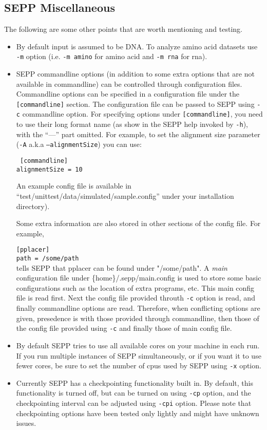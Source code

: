 \documentclass[11pt]{article} %
\newcommand{\sepp}{SEPP\xspace}
\newcommand{\ins}[1]{{\tt #1}}
\newcommand{\file}[1]{{\sf #1}}
\newcommand{\pplacer}{pplacer\xspace}
\begin{document}
\subsection{\sepp Miscellaneous }
The following are some other points that are worth mentioning and testing.
\begin{itemize}
\item By default input is assumed to be DNA. To analyze amino acid datasets use \ins{-m} option (i.e. \ins{-m amino} for amino acid and \ins{-m rna} for rna).
\item \sepp commandline options (in addition to some extra options that are not available in commandline) can be 
controlled through configuration files. 
Commandline options can be specified in a configuration file under the \ins{[commandline]} section.
The configuration file can be passed to \sepp using \ins{-c} commandline option. 
For specifying options under \ins{[commandline]}, you need to use their long format name (as show in the \sepp help invoked by \ins{-h}), with the ``---'' part omitted.
For example, to set the alignment size parameter (\ins{-A} a.k.a \ins{--alignmentSize}) you can use:

\ins{
[commandline]\\
alignmentSize = 10} 

An example config file is available in ``test/unittest/data/simulated/sample.config'' under your installation directory). 
 
Some extra information are also stored in other sections of the config file. For example, 

\ins{[pplacer]\\
path = /some/path\\
}
tells \sepp that \pplacer can be found under "/some/path".
A {\em main} configuration file under \file{\{home\}/.sepp/main.config} is used
to store some basic configurations such as the location of extra programs, etc.
This main config file is read first. Next the config file provided throuth \ins{-c} option is read, and finally commandline options are read.
Therefore, when conflicting options are given, presedence is with those provided through commandline, then those of the config file provided using \ins{-c} and finally those of main config file. 

\item By default \sepp tries to use all available cores on your machine in each run. If you run multiple instances of \sepp simultaneously, or if you want it to use fewer cores, be sure
to set the number of cpus used by \sepp using \ins{-x} option. 
\item Currently \sepp has a checkpointing functionality built in.
By default, this functionality is turned off, but can be turned on using \ins{-cp} option, 
and the checkpointing interval can be adjusted using \ins{-cpi} option.
Please note that checkpointing options have been tested only lightly and might have unknown issues. 
\end{itemize}




\end{document}
